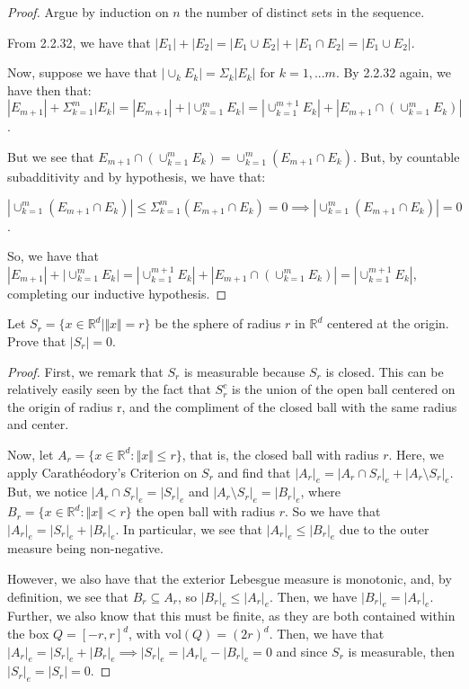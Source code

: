\documentclass[10pt]{article}
\newenvironment{problem}[2][Problem]{\begin{trivlist}
\item[\hskip \labelsep {\bfseries #1}\hskip \labelsep {\bfseries #2.}]}{\end{trivlist}}
\begin{document}
\begin{proof}[Proof]

Argue by induction on $n$ the number of distinct sets in the sequence.

From 2.2.32, we have that $|E_1| + |E_2| = |E_1 \cup E_2 | + | E_1 \cap E_2 | =  |E_1 \cup E_2 |$.

Now, suppose we have that $ |\cup_k E_k | = \Sigma_k|E_k| $ for $ k = 1,...m$. By 2.2.32 again, we have then that: $|E_{m+1}| + \Sigma_{k=1}^m |E_k| = |E_{m+1}| + |\cup_{k=1}^{m} E_k| = |\cup_{k=1}^{m+1} E_k | + | E_{m+1} \cap (\cup_{k=1}^{m} E_k)|$.

But we see that $E_{m+1} \cap (\cup_{k=1}^{m} E_k) = \cup_{k=1}^m (E_{m+1} \cap E_k)$. But, by countable subadditivity and by hypothesis, we have that:

$$|\cup_{k=1}^m (E_{m+1} \cap E_k)| \leq \Sigma_{k=1}^m (E_{m+1} \cap E_k) = 0 \implies |\cup_{k=1}^m (E_{m+1} \cap E_k)| = 0$$.

So, we have that $|E_{m+1}| + |\cup_{k=1}^{m} E_k| = |\cup_{k=1}^{m+1} E_k | + | E_{m+1} \cap (\cup_{k=1}^{m} E_k)| = |\cup_{k=1}^{m+1} E_k | $, completing our inductive hypothesis.

\end{proof}

\begin{problem}{2.2.34}
Let $S_r = \{ x \in \mathbb{R}^d | \Vert x \Vert = r \}$ be the sphere of radius $r$ in $\mathbb{R}^d$ centered at the origin. Prove that $|S_r|  = 0$.
\end{problem}

\begin{proof}[Proof]
First, we remark that $S_r$ is measurable because $S_r$ is closed. This can be relatively easily seen by the fact that $S_r^c$ is the union of the open ball centered on the origin of radius r, and the compliment of the closed ball with the same radius and center.

Now, let $A_r = \{ x \in \mathbb{R}^d : \Vert x \Vert \leq r \}$, that is, the closed ball with radius $r$. Here, we apply Carath\'eodory's Criterion on $S_r$ and find that $|A_r|_e = | A_r \cap S_r|_e + | A_r \setminus S_r|_e$. But, we notice $| A_r \cap S_r|_e = |S_r|_e$ and $ | A_r \setminus S_r|_e = |B_r|_e$, where $B_r =  \{ x \in \mathbb{R}^d : \Vert x \Vert < r \}$  the open ball with radius $r$. So we have that $|A_r|_e = |S_r|_e + |B_r|_e$. In particular, we see that $|A_r|_e \leq |B_r|_e$ due to the outer measure being non-negative.

However, we also have that the exterior Lebesgue measure is monotonic, and, by definition, we see that $B_r \subseteq A_r$, so $|B_r|_e \leq |A_r|_e$. Then, we have $|B_r|_e = |A_r|_e$. Further, we also know that this must be finite, as they are both contained within the box $Q = [-r,r]^d$, with $\text{vol}(Q) = (2r)^d$. Then, we have that $|A_r|_e = |S_r|_e + |B_r|_e \implies |S_r|_e = |A_r|_e - |B_r|_e = 0$ and since $S_r$ is measurable, then $|S_r|_e = |S_r| = 0$.


\end{proof}
\end{document}
